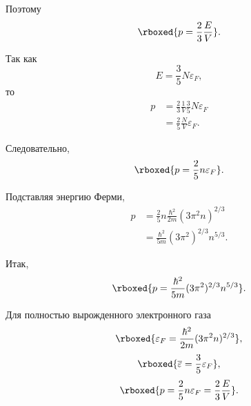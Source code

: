 \documentclass[../final.tex]{subfiles}
\begin{document}
Поэтому
%
\begin{equation*}
    \rboxed{
        p
        =
        \frac{2}{3}
        \frac{E}{V}
    }.
\end{equation*}

Так как
%
\begin{equation*}
    E
    =
    \frac{3}{5}
    N\varepsilon_F,
\end{equation*}
%
то
%
\begin{align*}
    p
    &=
    \frac{2}{3}
    \frac{1}{V}
    \frac{3}{5}
    N\varepsilon_F
    \\[3pt]
    &=
    \frac{2}{5}
    \frac{N}{V}
    \varepsilon_F.
\end{align*}

Следовательно,
%
\begin{equation*}
    \rboxed{
        p
        =
        \frac{2}{5}
        n\varepsilon_F
    }.
\end{equation*}

Подставляя энергию Ферми,
%
\begin{align*}
    p
    &=
    \frac{2}{5}
    n
    \frac{
        \hbar^2
    }{
        2m
    }
    (3\pi^2n)^{2/3}
    \\[3pt]
    &=
    \frac{
        \hbar^2
    }{
        5m
    }
    (3\pi^2)^{2/3}
    n^{5/3}.
\end{align*}

Итак,
%
\begin{equation*}
    \rboxed{
        p
        =
        \frac{
            \hbar^2
        }{
            5m
        }
        (3\pi^2)^{2/3}
        n^{5/3}
    }.
\end{equation*}



\answer

Для полностью вырожденного электронного газа
%
\begin{equation*}
    \rboxed{
        \varepsilon_F
        =
        \frac{
            \hbar^2
        }{
            2m
        }
        (3\pi^2n)^{2/3}
    },
\end{equation*}
%
%
\begin{equation*}
    \rboxed{
        \overline{\varepsilon}
        =
        \frac{3}{5}
        \varepsilon_F
    },
\end{equation*}
%
%
\begin{equation*}
    \rboxed{
        p
        =
        \frac{2}{5}
        n\varepsilon_F
        =
        \frac{2}{3}
        \frac{E}{V}
    }.
\end{equation*}
\end{document}
